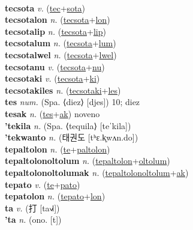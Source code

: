  \label{tecwelon} \\
\textbf{tecsota} \textit{v.} (\hyperref[tec]{tec}+\hyperref[sota]{sota})
 \label{tecsota} \\
\textbf{tecsotalon} \textit{n.} (\hyperref[tecsota]{tecsota}+\hyperref[lon]{lon})
 \label{tecsotalon} \\
\textbf{tecsotalip} \textit{n.} (\hyperref[tecsota]{tecsota}+\hyperref[lip]{lip})
 \label{tecsotalip} \\
\textbf{tecsotalum} \textit{n.} (\hyperref[tecsota]{tecsota}+\hyperref[lum]{lum})
 \label{tecsotalum} \\
\textbf{tecsotalwel} \textit{n.} (\hyperref[tecsota]{tecsota}+\hyperref[lwel]{lwel})
 \label{tecsotalwel} \\
\textbf{tecsotanu} \textit{v.} (\hyperref[tecsota]{tecsota}+\hyperref[nu]{nu})
 \label{tecsotanu} \\
\textbf{tecsotaki} \textit{v.} (\hyperref[tecsota]{tecsota}+\hyperref[ki]{ki})
 \label{tecsotaki} \\
\textbf{tecsotakiles} \textit{n.} (\hyperref[tecsotaki]{tecsotaki}+\hyperref[les]{les})
 \label{tecsotakiles} \\
\textbf{tes} \textit{num.} (Spa. ⟨diez⟩ [djes])
10; diez \label{tes} \\
\textbf{tesak} \textit{n.} (\hyperref[tes]{tes}+\hyperref[ak]{ak})
noveno \label{tesak} \\
\textbf{'tekila} \textit{n.} (Spa. ⟨tequila⟩ [teˈkila])
 \label{'tekila} \\
\textbf{'tekwanto} \textit{n.} ({\korean{}태권도} [tʰɛ.k͈wʌn.do])
 \label{'tekwanto} \\
\textbf{tepaltolon} \textit{n.} (\hyperref[te]{te}+\hyperref[paltolon]{paltolon})
 \label{tepaltolon} \\
\textbf{tepaltolonoltolum} \textit{n.} (\hyperref[tepaltolon]{tepaltolon}+\hyperref[oltolum]{oltolum})
 \label{tepaltolonoltolum} \\
\textbf{tepaltolonoltolumak} \textit{n.} (\hyperref[tepaltolonoltolum]{tepaltolonoltolum}+\hyperref[ak]{ak})
 \label{tepaltolonoltolumak} \\
\textbf{tepato} \textit{v.} (\hyperref[te]{te}+\hyperref[pato]{pato})
 \label{tepato} \\
\textbf{tepatolon} \textit{n.} (\hyperref[tepato]{tepato}+\hyperref[lon]{lon})
 \label{tepatolon} \\
\textbf{ta} \textit{v.} ({\chinese{}打} [ta˧˩˧])
 \label{ta} \\
\textbf{'ta} \textit{n.} (ono. [t])
